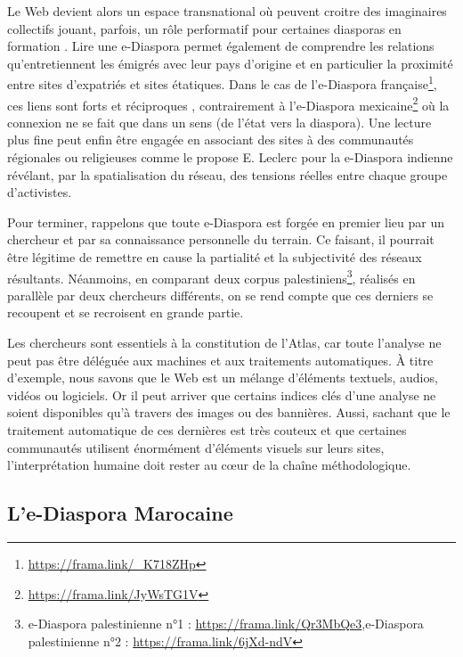 \documentclass[symmetric,justified,marginals=raggedouter]{tufte-book}
\begin{document}
\noindent Le Web devient alors un espace transnational où peuvent croitre des imaginaires collectifs jouant, parfois, un rôle performatif pour certaines diasporas en formation \citep{brusle_les_2012}. Lire une e-Diaspora permet également de comprendre les relations qu'entretiennent les émigrés avec leur pays d'origine et en particulier la proximité entre sites d'expatriés et sites étatiques. Dans le cas de l'e-Diaspora française\footnote{\RaggedOuter \url{https://frama.link/_K718ZHp}}, ces liens sont forts et réciproques \citep{berthomiere_french_2013}, contrairement à l'e-Diaspora mexicaine\footnote{\RaggedOuter \url{https://frama.link/JyWsTG1V}} où la connexion ne se fait que dans un sens (de l'état vers la diaspora). Une lecture plus fine peut enfin être engagée en associant des sites à des communautés régionales ou religieuses comme le propose E. Leclerc pour la e-Diaspora indienne \citep{leclerc_cyberespace_2012} révélant, par la spatialisation du réseau, des tensions réelles entre chaque groupe d'activistes. 

Pour terminer, rappelons que toute e-Diaspora est forgée en premier lieu par un chercheur et par sa connaissance personnelle du terrain. Ce faisant, il pourrait être légitime de remettre en cause la partialité et la subjectivité des réseaux résultants. Néanmoins, en comparant deux corpus palestiniens\footnote{\RaggedOuter e-Diaspora palestinienne n°1 : \url{https://frama.link/Qr3MbQe3},e-Diaspora palestinienne n°2 : \url{https://frama.link/6jXd-ndV}}, réalisés en parallèle par deux chercheurs différents, on se rend compte que ces derniers se recoupent et se recroisent en grande partie. 

Les chercheurs sont essentiels à la constitution de l'Atlas, car toute l'analyse ne peut pas être déléguée aux machines et aux traitements automatiques. À titre d'exemple, nous savons que le Web est un mélange d'éléments textuels, audios, vidéos ou logiciels. Or il peut arriver que certains indices clés d'une analyse ne soient disponibles qu'à travers des images ou des bannières. Aussi, sachant que le traitement automatique de ces dernières est très couteux \citep{ben-david_colors_2018} et que certaines communautés utilisent énormément d'éléments visuels sur leurs sites, l'interprétation humaine doit rester au cœur de la chaîne méthodologique.

\subsection{L'e-Diaspora Marocaine}
\end{document}
